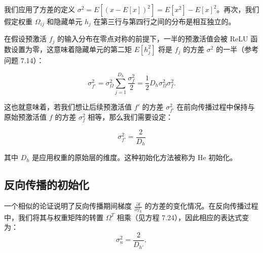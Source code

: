 \documentclass[lang=cn,newtx,10pt,scheme=chinese]{elegantbook}
\begin{document}
我们应用了方差的定义 \(\sigma^2 = E[(x - E[x])^2] = E[x^2] - E[x]^2\)。再次，我们假定权重 \(\Omega_{ij}\) 和隐藏单元 \(h_j\) 在第三行与第四行之间的分布是相互独立的。

在假设预激活 \(f_j\) 的输入分布在零点对称的前提下，一半的预激活值会被 ReLU 函数设置为零，这意味着隐藏单元的第二矩 \(E[h_j^2]\) 将是 \(f_j\) 的方差 \(\sigma^2\) 的一半（参考问题 7.14）：

\begin{equation}
\sigma_{f'}^2 = \sigma_\Omega^2 \sum_{j=1}^{D_h} \frac{\sigma_f^2}{2} = \frac{1}{2} D_h\sigma_\Omega^2\sigma_f^2. 
\end{equation}

这也就意味着，若我们想让后续预激活值 \(f'\) 的方差 \(\sigma_{f'}^2\) 在前向传播过程中保持与原始预激活值 \(f\) 的方差 \(\sigma_f^2\) 相等，那么我们需要设定：

\begin{equation}
\sigma_{f'}^2 = \frac{2}{D_h} 
\end{equation}

其中 \(D_h\) 是应用权重的原始层的维度。这种初始化方法被称为 He 初始化。


\subsection{反向传播的初始化}
一个相似的论证说明了反向传播期间梯度 \(\frac{\partial l}{\partial f_k}\) 的方差的变化情况。在反向传播过程中，我们将其与权重矩阵的转置 \(\Omega^T\) 相乘（见方程 7.24），因此相应的表达式变为：
\begin{equation}
\sigma^2_n = \frac{2}{D_{h'}}, 
\end{equation}
\end{document}
